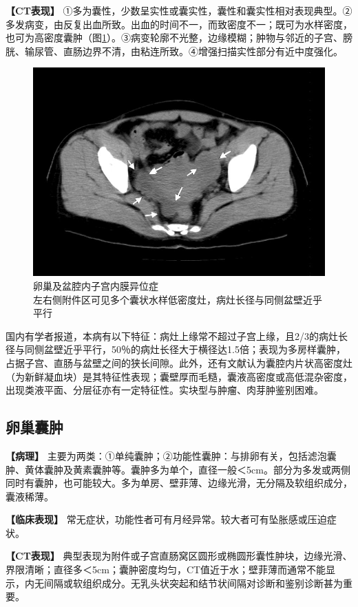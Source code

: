 \textbf{【CT表现】}
①多为囊性，少数呈实性或囊实性，囊性和囊实性相对表现典型。②多发病变，由反复出血所致。出血的时间不一，而致密度不一；既可为水样密度，也可为高密度囊肿（图\ref{fig21-11}）。③病变轮廓不光整，边缘模糊；肿物与邻近的子宫、膀胱、输尿管、直肠边界不清，由粘连所致。④增强扫描实性部分有近中度强化。

\begin{figure}[!htbp]
 \centering
 \includegraphics[width=.7\textwidth,height=\textheight,keepaspectratio]{./images/Image00408.jpg}
 \captionsetup{justification=centering}
 \caption{卵巢及盆腔内子宫内膜异位症\\{\small 左右侧附件区可见多个囊状水样低密度灶，病灶长径与同侧盆壁近乎平行}}
 \label{fig21-11}
  \end{figure} 

国内有学者报道，本病有以下特征：病灶上缘常不超过子宫上缘，且2/3的病灶长径与同侧盆壁近乎平行，50％的病灶长径大于横径达1.5倍；表现为多房样囊肿，占据子宫、直肠与盆壁之间的狭长间隙。此外，还有文献认为囊腔内片状高密度灶（为新鲜凝血块）是其特征性表现；囊壁厚而毛糙，囊液高密度或高低混杂密度，出现类液平面、分层征亦有一定特征性。实块型与肿瘤、肉芽肿鉴别困难。

\subsection{卵巢囊肿}

\textbf{【病理】}
主要为两类：①单纯囊肿；②功能性囊肿：与排卵有关，包括滤泡囊肿、黄体囊肿及黄素囊肿等。囊肿多为单个，直径一般＜5cm。部分为多发或两侧同时有囊肿，也可能较大。多为单房、壁菲薄、边缘光滑，无分隔及软组织成分，囊液稀薄。

\textbf{【临床表现】}
常无症状，功能性者可有月经异常。较大者可有坠胀感或压迫症状。

\textbf{【CT表现】}
典型表现为附件或子宫直肠窝区圆形或椭圆形囊性肿块，边缘光滑、界限清晰；直径多＜5cm；囊肿密度均匀，CT值近于水；壁菲薄而通常不能显示，内无间隔或软组织成分。无乳头状突起和结节状间隔对诊断和鉴别诊断甚为重要。

